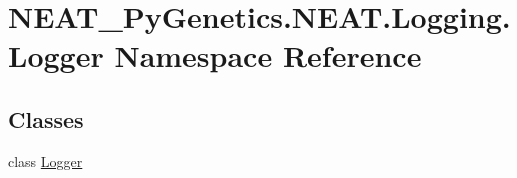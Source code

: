 \hypertarget{namespaceNEAT__PyGenetics_1_1NEAT_1_1Logging_1_1Logger}{}\section{N\+E\+A\+T\+\_\+\+Py\+Genetics.\+N\+E\+A\+T.\+Logging.\+Logger Namespace Reference}
\label{namespaceNEAT__PyGenetics_1_1NEAT_1_1Logging_1_1Logger}
\subsection*{Classes}
\begin{DoxyCompactItemize}
\item 
class \hyperlink{classNEAT__PyGenetics_1_1NEAT_1_1Logging_1_1Logger_1_1Logger}{Logger}
\end{DoxyCompactItemize}
